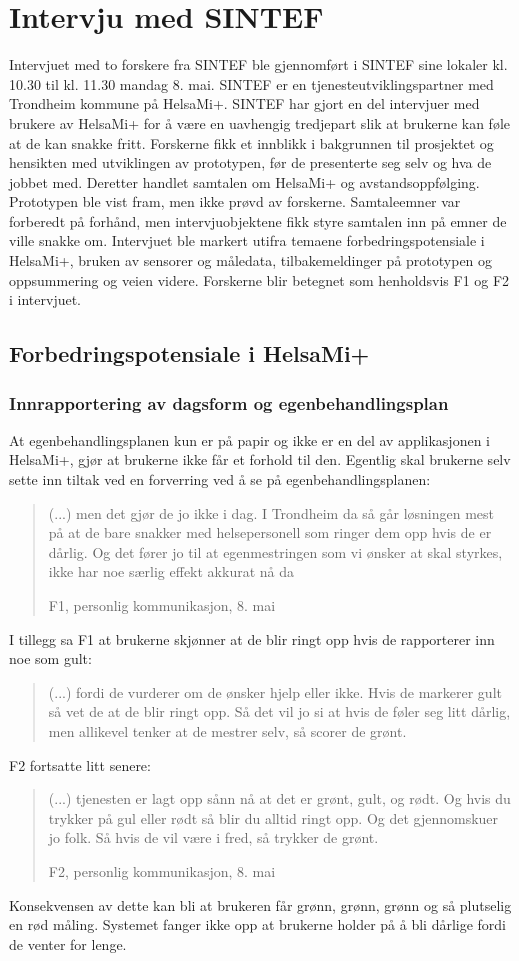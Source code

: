 \section{Intervju med SINTEF}\label{intervju-med-sintef}
Intervjuet med to forskere fra SINTEF ble gjennomført i SINTEF sine lokaler
kl. 10.30 til kl. 11.30 mandag 8. mai. SINTEF er en tjenesteutviklingspartner med
Trondheim kommune på HelsaMi+. SINTEF har gjort en del intervjuer med brukere av
HelsaMi+ for å være en uavhengig tredjepart slik at brukerne kan føle at de kan snakke fritt.
Forskerne fikk et innblikk i bakgrunnen til prosjektet og hensikten med utviklingen av prototypen,
før de presenterte seg selv og hva de jobbet med. Deretter handlet samtalen om
HelsaMi+ og avstandsoppfølging. Prototypen ble vist fram, men ikke prøvd av
forskerne. Samtaleemner var forberedt på forhånd, men intervjuobjektene fikk styre samtalen inn på emner
de ville snakke om. Intervjuet ble markert utifra temaene forbedringspotensiale i HelsaMi+, bruken av
sensorer og måledata, tilbakemeldinger på prototypen og oppsummering og veien videre.
Forskerne blir betegnet som henholdsvis F1 og F2 i intervjuet.

\subsection{Forbedringspotensiale i HelsaMi+}

\subsubsection{Innrapportering av dagsform og egenbehandlingsplan}
At egenbehandlingsplanen kun er på papir og ikke er en del av applikasjonen i HelsaMi+, gjør at brukerne ikke
får et forhold til den. Egentlig skal brukerne selv sette inn tiltak ved en forverring ved å se på
egenbehandlingsplanen:
\blockquote[F1, personlig kommunikasjon, 8. mai]{(...) men det gjør de jo ikke i dag. I Trondheim da så går løsningen mest
    på at de bare snakker med helsepersonell som ringer dem opp hvis de
er dårlig. Og det fører jo til at egenmestringen som vi ønsker at skal styrkes, ikke har noe særlig effekt akkurat nå da}

I tillegg sa F1 at brukerne skjønner at de blir ringt opp hvis de rapporterer inn noe som gult: \blockquote{(...) fordi de vurderer om de ønsker hjelp eller ikke.
    Hvis de markerer gult så vet de at de blir ringt opp. Så det vil jo si at hvis de føler seg litt dårlig, men allikevel tenker at de mestrer selv,
så scorer de grønt.}
F2 fortsatte litt senere: \blockquote[F2, personlig kommunikasjon, 8. mai]{(...) tjenesten er lagt opp sånn nå at det er grønt, gult, og rødt. Og
hvis du trykker på gul eller rødt så blir du alltid ringt opp. Og det gjennomskuer jo folk. Så hvis de vil være i fred, så trykker de grønt.}
Konsekvensen av dette kan bli at brukeren får grønn, grønn, grønn og så plutselig en rød måling. Systemet fanger ikke opp at brukerne holder på å bli
dårlige fordi de venter for lenge.

